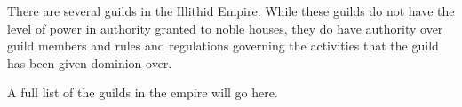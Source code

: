 There are several guilds in the Illithid Empire.
While these guilds do not have the level of power in authority granted to noble houses, they do have authority over guild members and rules and regulations governing the activities that the guild has been given dominion over.

A full list of the guilds in the empire will go here.
